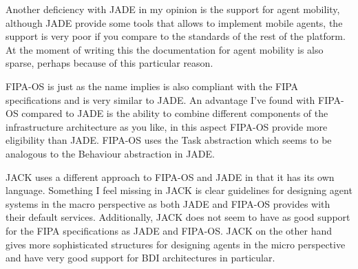 \documentclass[paper=letter, fontsize=12pt]{article}
\begin{document}
Another deficiency with JADE in my opinion is the support for agent mobility, although JADE provide some tools that allows to implement mobile agents, the support is very poor if you compare to the standards of the rest of the platform. At the moment of writing this the documentation for agent mobility is also sparse, perhaps because of this particular reason.

FIPA-OS is just as the name implies is also compliant with the FIPA specifications and is very similar to JADE. An advantage I've found with FIPA-OS compared to JADE is the ability to combine different components of the infrastructure architecture as you like, in this aspect FIPA-OS provide more eligibility than JADE. FIPA-OS uses the Task abstraction which seems to be analogous to the Behaviour abstraction in JADE.

JACK uses a different approach to FIPA-OS and JADE in that it has its own language. Something I feel missing in JACK is clear guidelines for designing agent systems in the macro perspective as both JADE and FIPA-OS provides with their default services. Additionally, JACK does not seem to have as good support for the FIPA specifications as JADE and FIPA-OS. JACK on the other hand gives more sophisticated structures for designing agents in the micro perspective and have very good support for BDI architectures in particular.
{}

\end{document}
